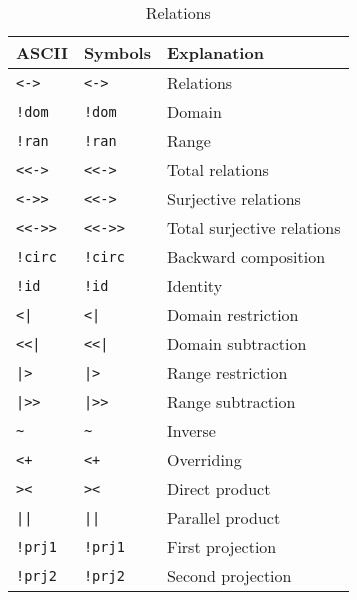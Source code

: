 \begin{EventBNoShortInline}
  \begin{table}[!htbp]
    \centering
    \begin{tabular}{|l|l|l|}
      \hline
      ASCII & Symbols & Explanation \\
      \hline
      \verb$<->$ & \lstinline$<->$ & Relations \\
      \verb$!dom$ & \lstinline$!dom$ & Domain \\
      \verb$!ran$ & \lstinline$!ran$ & Range \\
      \verb$<<->$ & \lstinline$<<->$ & Total relations \\
      \verb$<->>$ & \lstinline$<<->$ & Surjective relations \\
      \verb$<<->>$ & \lstinline$<<->>$ & Total surjective relations \\
      \verb$!circ$ & \lstinline$!circ$ & Backward composition \\
      \verb$!id$ & \lstinline$!id$ & Identity \\
      \verb$<|$ & \lstinline$<|$ & Domain restriction \\
      \verb$<<|$ & \lstinline$<<|$ & Domain subtraction \\
      \verb$|>$ & \lstinline$|>$ & Range restriction \\
      \verb$|>>$ & \lstinline$|>>$ & Range subtraction \\
      \verb$~$ & \lstinline$~$ & Inverse \\
      \verb$<+$ & \lstinline$<+$ & Overriding \\
      \verb$><$ & \lstinline$><$ & Direct product \\
      \verb$||$ & \lstinline$||$ & Parallel product \\
      \verb$!prj1$ & \lstinline$!prj1$ & First projection \\
      \verb$!prj2$ & \lstinline$!prj2$ & Second projection \\
      \hline
    \end{tabular}
    \caption{Relations}
  \end{table}
  

\end{EventBNoShortInline}

